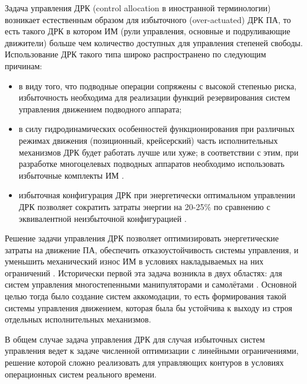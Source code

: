 {\actuality}
Задача управления ДРК (control allocation в иностранной терминологии) возникает естественным образом для избыточного (over-actuated) ДРК ПА, то есть такого ДРК в котором ИМ (рули управления, основные и подруливающие движители) больше чем количество доступных для управления степеней свободы. Использование ДРК такого типа широко распространено по следующим причинам:

\begin{itemize}
    \item в виду того, что подводные операции сопряжены с высокой степенью риска, избыточность необходима для реализации функций резервирования систем управления движением подводного аппарата;
    \item в силу гидродинамических особенностей функционирования при различных режимах движения (позиционный, крейсерский) часть исполнительных механизмов ДРК будет работать лучше или хуже; в соответствии с этим, при разработке многоцелевых подводных аппаратов необходимо использовать избыточные комплекты ИМ \cite{valasek2002design}.
    \item избыточная конфигурация ДРК при энергетически оптимальном управлении ДРК позволяет сократить затраты энергии на 20-25\% по сравнению с эквивалентной неизбыточной конфигурацией \cite{бриллиантов2005разработка}.
\end{itemize}

Решение задачи управления ДРК позволяет оптимизировать энергетические затраты на движение ПА, обеспечить отказоустойчивость системы управления, и уменьшить механический износ ИМ в условиях накладываемых на них ограничений \cite{enns1998control}.
Исторически первой эта задача возникла в двух областях: для систем управления многостепенными манипуляторами \cite{craig2009introduction} и самолётами \cite{bordignon1996constrained}. 
Основной целью тогда было создание систем аккомодации, то есть формирования такой системы управления движением, которая была бы устойчива к выходу из строя отдельных исполнительных механизмов.

В общем случае задача управления ДРК для случая избыточных систем управления ведет к задаче численной оптимизации с линейными ограничениями, решение которой сложно реализовать для управляющих контуров в условиях операционных систем реального времени.

